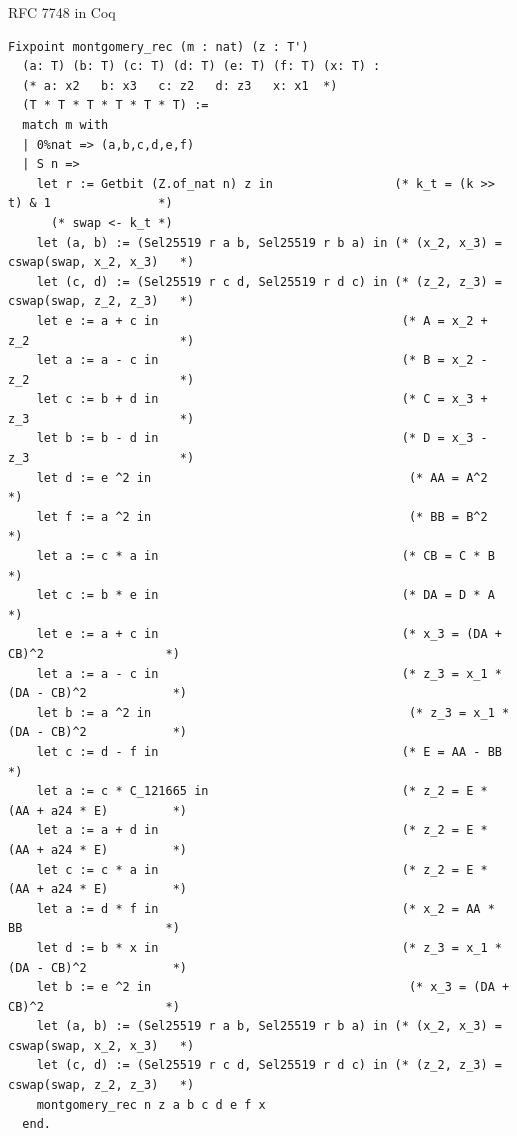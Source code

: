 \documentclass[8pt,aspectratio=169]{beamer}
\begin{document}
%
%
\begin{frame}[fragile]{RFC 7748 in Coq}
  \begin{center}
  \begin{lstlisting}[language=Coq]
  Fixpoint montgomery_rec (m : nat) (z : T')
  (a: T) (b: T) (c: T) (d: T) (e: T) (f: T) (x: T) :
  (* a: x2   b: x3   c: z2   d: z3   x: x1  *)
  (T * T * T * T * T * T) :=
  match m with
  | 0%nat => (a,b,c,d,e,f)
  | S n =>
    let r := Getbit (Z.of_nat n) z in                 (* k_t = (k >> t) & 1               *)
      (* swap <- k_t *)
    let (a, b) := (Sel25519 r a b, Sel25519 r b a) in (* (x_2, x_3) = cswap(swap, x_2, x_3)   *)
    let (c, d) := (Sel25519 r c d, Sel25519 r d c) in (* (z_2, z_3) = cswap(swap, z_2, z_3)   *)
    let e := a + c in                                  (* A = x_2 + z_2                     *)
    let a := a - c in                                  (* B = x_2 - z_2                     *)
    let c := b + d in                                  (* C = x_3 + z_3                     *)
    let b := b - d in                                  (* D = x_3 - z_3                     *)
    let d := e ^2 in                                    (* AA = A^2                         *)
    let f := a ^2 in                                    (* BB = B^2                         *)
    let a := c * a in                                  (* CB = C * B                      *)
    let c := b * e in                                  (* DA = D * A                      *)
    let e := a + c in                                  (* x_3 = (DA + CB)^2                 *)
    let a := a - c in                                  (* z_3 = x_1 * (DA - CB)^2            *)
    let b := a ^2 in                                    (* z_3 = x_1 * (DA - CB)^2            *)
    let c := d - f in                                  (* E = AA - BB                     *)
    let a := c * C_121665 in                           (* z_2 = E * (AA + a24 * E)         *)
    let a := a + d in                                  (* z_2 = E * (AA + a24 * E)         *)
    let c := c * a in                                  (* z_2 = E * (AA + a24 * E)         *)
    let a := d * f in                                  (* x_2 = AA * BB                    *)
    let d := b * x in                                  (* z_3 = x_1 * (DA - CB)^2            *)
    let b := e ^2 in                                    (* x_3 = (DA + CB)^2                 *)
    let (a, b) := (Sel25519 r a b, Sel25519 r b a) in (* (x_2, x_3) = cswap(swap, x_2, x_3)   *)
    let (c, d) := (Sel25519 r c d, Sel25519 r d c) in (* (z_2, z_3) = cswap(swap, z_2, z_3)   *)
    montgomery_rec n z a b c d e f x
  end.
  \end{lstlisting}
  \end{center}
\end{frame}
\end{document}
